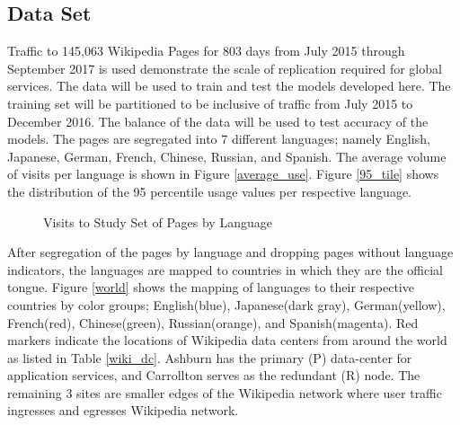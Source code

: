 \documentclass[conference]{IEEEtran}
\begin{document}
\subsection{Data Set}
Traffic to 145,063 Wikipedia Pages for 803 days from July 2015 through September 2017 is used demonstrate the scale of replication required for global services. The data will be used to train and test the models developed here. The training set will be partitioned to be inclusive of traffic from July 2015 to December 2016. The balance of the data will be used to test accuracy of the models. The pages are segregated into 7 different languages; namely English, Japanese, German, French, Chinese, Russian, and Spanish. The average volume of visits per language is shown in Figure \ref{average_use}. Figure \ref{95_tile} shows the distribution of the 95 percentile usage values per respective language.


\begin{figure}[!tbh]
  \caption{Visits to Study Set of Pages by Language}
\end{figure}

After segregation of the pages by language and dropping pages without language indicators, the languages are mapped to countries in which they are the official tongue. Figure \ref{world} shows the mapping of languages to their respective countries by color groups; English(blue), Japanese(dark gray), German(yellow), French(red), Chinese(green), Russian(orange), and Spanish(magenta). Red markers indicate the locations of Wikipedia data centers from around the world as listed in Table \ref{wiki_dc}. Ashburn has the primary (P) data-center for application services, and Carrollton serves as the redundant (R) node. The remaining 3 sites are smaller edges of the Wikipedia network where user traffic ingresses and egresses Wikipedia network. 
\end{document}
